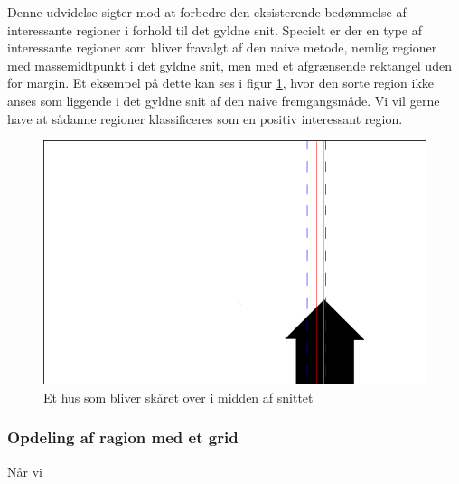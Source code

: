 {
Denne udvidelse sigter mod at forbedre den eksisterende bedømmelse af
interessante regioner i forhold til det gyldne snit. Specielt er der
en type af interessante regioner som bliver fravalgt af den naive
metode, nemlig regioner med massemidtpunkt i det gyldne snit, men med et
afgrænsende rektangel uden for margin. Et eksempel på dette kan ses i
figur \ref{hus}, hvor den sorte region ikke anses som liggende i det
gyldne snit af den naive fremgangsmåde. Vi vil gerne have at sådanne
regioner klassificeres som en positiv interessant region.


\begin{figure}[h]
	\begin{center}
		\includegraphics[scale=0.3,angle=0]{afsnit/vores_implementation/billeder/udvidet_loesning/husworks.png}
	\end{center}
	\caption[]{Et hus som bliver skåret over i midden af snittet}
	\label{hus}
\end{figure}


\subsubsection{Opdeling af ragion med et grid}
Når vi


}
